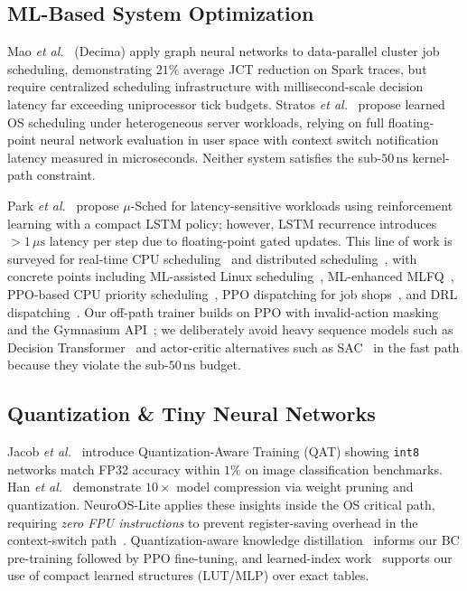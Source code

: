\subsection{ML-Based System Optimization}

Mao \textit{et al.}~\cite{Mao2019} (Decima) apply graph neural networks to
data-parallel cluster job scheduling, demonstrating $21\%$ average JCT
reduction on Spark traces, but require centralized scheduling infrastructure
with millisecond-scale decision latency far exceeding uniprocessor tick budgets.
Stratos \textit{et al.}~\cite{Stratos2020} propose learned OS scheduling under
heterogeneous server workloads, relying on full floating-point neural network
evaluation in user space with context switch notification latency measured in
microseconds. Neither system satisfies the sub-$50\,\text{ns}$
kernel-path constraint.

Park \textit{et al.}~\cite{Park2020} propose $\mu$-Sched for latency-sensitive
workloads using reinforcement learning with a compact LSTM policy; however,
LSTM recurrence introduces $>1\,\mu\text{s}$ latency per step due to
floating-point gated updates. This line of work is surveyed for real-time CPU
scheduling~\cite{SurveyAccess2021} and distributed
scheduling~\cite{DRLDistrib2021}, with concrete points including ML-assisted
Linux scheduling~\cite{LinuxSchedML2020}, ML-enhanced
MLFQ~\cite{MLFQFuture2021}, PPO-based CPU priority
scheduling~\cite{PPOAdaptive2023}, PPO dispatching for job
shops~\cite{PPODispatch2022}, and DRL
dispatching~\cite{LearnDispatch2020}. Our off-path trainer builds on PPO with
invalid-action masking~\cite{Huang2022} and the Gymnasium
API~\cite{Gymnasium2023}; we deliberately avoid heavy sequence models such as
Decision Transformer~\cite{DecisionTransformer2021} and actor-critic
alternatives such as SAC~\cite{SAC2018} in the fast path because they violate
the sub-$50\,\text{ns}$ budget.

\subsection{Quantization \& Tiny Neural Networks}

Jacob \textit{et al.}~\cite{Jacob2018} introduce Quantization-Aware Training
(QAT) showing \texttt{int8} networks match FP32 accuracy within $1\%$ on image
classification benchmarks. Han \textit{et al.}~\cite{Han2016} demonstrate
$10\times$ model compression via weight pruning and quantization.
NeuroOS-Lite applies these insights inside the OS critical path, requiring
\emph{zero FPU instructions} to prevent register-saving overhead in the
context-switch path~\cite{IntelSysProgGuide}. Quantization-aware knowledge
distillation~\cite{QKD2019} informs our BC pre-training followed by PPO
fine-tuning, and learned-index work~\cite{LearnedIndex2017} supports our use
of compact learned structures (LUT/MLP) over exact tables.

